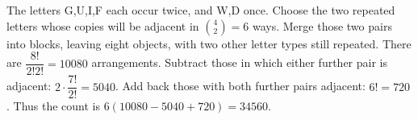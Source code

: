 The letters G,U,I,F each occur twice, and W,D once. Choose the two repeated letters whose copies will be adjacent in $\binom42=6 $ ways. Merge those two pairs into blocks, leaving eight objects, with two other letter types still repeated. There are $\dfrac{8!}{2!2!}=10080 $ arrangements. Subtract those in which either further pair is adjacent: $ 2\cdot\dfrac{7!}{2!}=5040 $. Add back those with both further pairs adjacent: $ 6!=720 $. Thus the count is $ 6(10080-5040+720)=\boxed{34560}$.
